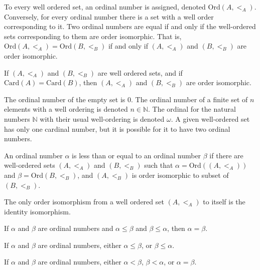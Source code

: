         To every well ordered set, an ordinal number is
        assigned, denoted $\mathrm{Ord}(A,<_{A})$. Conversely,
        for every ordinal number there is a set with a
        well order corresponding to it. Two ordinal numbers
        are equal if and only if the well-ordered sets
        corresponding to them are order isomorphic.
        That is,
        $\mathrm{Ord}(A,<_{A})=\mathrm{Ord}(B,<_{B})$ if and only if
        $(A,<_{A})$ and $(B,<_{B})$ are order isomorphic.
        \begin{theorem}
           If $(A,<_{A})$ and $(B,<_{B})$ are well ordered
           sets, and if $\mathrm{Card}(A)=\mathrm{Card}(B)$, then
           $(A,<_{A})$ and $(B,<_{B})$ are order
           isomorphic.
        \end{theorem}
        The ordinal number of the empty set is $0$. The
        ordinal number of a finite set of $n$ elements with
        a well ordering is denoted $n\in\mathbb{N}$.
        The ordinal for the natural numbers $\mathbb{N}$
        with their usual well-ordering is denoted $\omega$.
        A given well-ordered set has only one cardinal number,
        but it is possible for it to have two ordinal numbers.
        \begin{definition}
           An ordinal number $\alpha$ is less than or equal
           to an ordinal number $\beta$ if there are
           well-ordered sets $(A,<_{A})$ and $(B,<_{B})$
           such that $\alpha=\mathrm{Ord}((A,<_{A}))$ and
           $\beta=\mathrm{Ord}(B,<_{B})$, and $(A,<_{B})$ is
           order isomorphic to subset of
           $(B,<_{B})$.
        \end{definition}
        \begin{theorem}
           The only order isomorphism from a well ordered
           set $(A,<_{A})$ to itself is the identity
           isomorphism.
        \end{theorem}
        \begin{theorem}
           If $\alpha$ and $\beta$ are ordinal numbers and
           ${\alpha}\leq{\beta}$ and ${\beta}\leq{\alpha}$,
           then $\alpha=\beta$.
        \end{theorem}
        \begin{theorem}
           If $\alpha$ and $\beta$ are ordinal numbers,
           either ${\alpha}\leq{\beta}$, or
           ${\beta}\leq{\alpha}$.
        \end{theorem}
        \begin{theorem}
           If $\alpha$ and $\beta$ are ordinal numbers,
           either $\alpha<\beta$, $\beta<\alpha$, or
           $\alpha=\beta$.
        \end{theorem}
